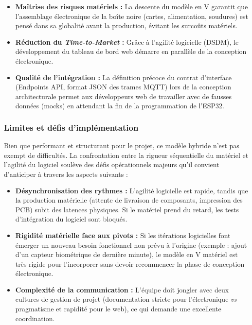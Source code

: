 \begin{itemize}
    \item \textbf{Maîtrise des risques matériels :} La descente du modèle en V garantit que l'assemblage électronique de la boîte noire (cartes, alimentation, soudures) est pensé dans sa globalité avant la production, évitant les surcoûts matériels.
    \item \textbf{Réduction du \emph{Time-to-Market} :} Grâce à l'agilité logicielle (DSDM), le développement du tableau de bord web démarre en parallèle de la conception électronique. 
    \item \textbf{Qualité de l'intégration :} La définition précoce du contrat d'interface (Endpoints API, format JSON des trames MQTT) lors de la conception architecturale permet aux développeurs web de travailler avec de fausses données (mocks) en attendant la fin de la programmation de l'ESP32.
\end{itemize}

\subsubsection{Limites et défis d'implémentation}

Bien que performant et structurant pour le projet, ce modèle hybride n'est pas exempt de difficultés. La confrontation entre la rigueur séquentielle du matériel et l'agilité du logiciel soulève des défis opérationnels majeurs qu'il convient d'anticiper à travers les aspects suivants :

\begin{itemize}
    \item \textbf{Désynchronisation des rythmes :} L'agilité logicielle est rapide, tandis que la production matérielle (attente de livraison de composants, impression des PCB) subit des latences physiques. Si le matériel prend du retard, les tests d'intégration du logiciel sont bloqués.
    \item \textbf{Rigidité matérielle face aux pivots :} Si les itérations logicielles font émerger un nouveau besoin fonctionnel non prévu à l'origine (exemple : ajout d'un capteur biométrique de dernière minute), le modèle en V matériel est très rigide pour l'incorporer sans devoir recommencer la phase de conception électronique.
    \item \textbf{Complexité de la communication :} L'équipe doit jongler avec deux cultures de gestion de projet (documentation stricte pour l'électronique \emph{vs} pragmatisme et rapidité pour le web), ce qui demande une excellente coordination.
\end{itemize}


